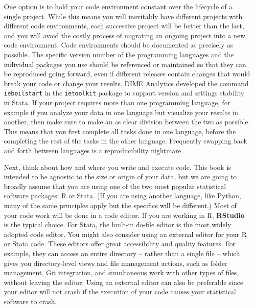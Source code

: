 One option is to hold your code environment constant
over the lifecycle of a single project.
While this means you will inevitably have different projects
with different code environments, each successive project will be better than the last,
and you will avoid the costly process of migrating an ongoing project
into a new code environment.
Code environments should be documented as precisely as possible.
The specific version number of the programming languages and the individual packages you use
should be referenced or maintained so that they can be reproduced going forward,
even if different releases contain changes that would break your code
or change your results.
DIME Analytics developed the command \texttt{ieboilstart} in the \texttt{ietoolkit} package
to support version and settings stability in Stata.
If your project requires more than one programming language,
for example if you analyze your data in one language but visualize your results in another,
then make sure to make an as clear division between the two as possible.
This means that you first complete all tasks done in one language,
before the completing the rest of the tasks in the other language.
Frequently swapping back and forth between languages is a reproducibility nightmare.

Next, think about how and where you write and execute code.
This book is intended to be agnostic to the size or origin of your data,
but we are going to broadly assume that you are using
one of the two most popular statistical software packages: R or Stata.
(If you are using another language, like Python,
many of the same principles apply but the specifics will be different.)
Most of your code work will be done in a code editor.
If you are working in R, \textbf{RStudio} is the typical choice.
For Stata, the built-in do-file editor is the most widely adopted code editor.
You might also consider using an external editor for your R or Stata code.
These editors offer great accessibility and quality features.
For example, they can access an entire directory -- rather than a single file --
which gives you directory-level views and file management actions,
such as folder management, Git integration,
and simultaneous work with other types of files, without leaving the editor.
Using an external editor can also be preferable since your editor will not crash
if the execution of your code causes your statistical software to crash.

